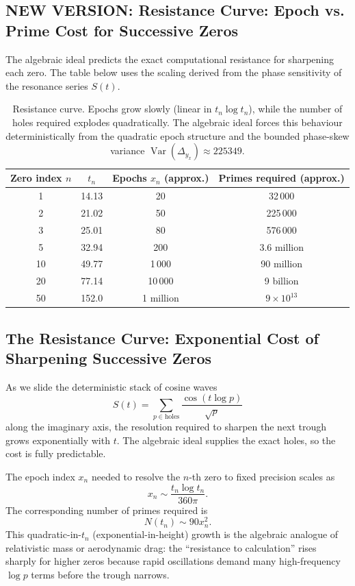 \documentclass[11pt,a4paper]{article}
\begin{document}
\subsection{NEW VERSION: Resistance Curve: Epoch vs. Prime Cost for Successive Zeros}

The algebraic ideal predicts the exact computational resistance for sharpening each zero. The table below uses the scaling derived from the phase sensitivity of the resonance series \(S(t)\).

\begin{table}[htbp]
\centering
\begin{tabular}{c|c|c|c}
Zero index \(n\) & \(t_n\) & Epochs \(x_n\) (approx.) & Primes required (approx.) \\
\hline
1  & 14.13 & 20   & 32\,000 \\
2  & 21.02 & 50   & 225\,000 \\
3  & 25.01 & 80   & 576\,000 \\
5  & 32.94 & 200  & 3.6 million \\
10 & 49.77 & 1\,000 & 90 million \\
20 & 77.14 & 10\,000 & 9 billion \\
50 & 152.0 & 1 million & \(9\times10^{13}\) \\
\end{tabular}
\caption{Resistance curve. Epochs grow slowly (linear in \(t_n \log t_n\)), while the number of holes required explodes quadratically. The algebraic ideal forces this behaviour deterministically from the quadratic epoch structure and the bounded phase-skew variance \(\operatorname{Var}(\Delta_{y_x})\approx225349\).}
\label{tab:resistance-curve}
\end{table}


\subsection{The Resistance Curve: Exponential Cost of Sharpening Successive Zeros}

As we slide the deterministic stack of cosine waves
\[
S(t)=\sum_{p\in\text{holes}}\frac{\cos(t\log p)}{\sqrt{p}}
\]
along the imaginary axis, the resolution required to sharpen the next trough grows exponentially with \(t\). The algebraic ideal supplies the exact holes, so the cost is fully predictable.

The epoch index \(x_n\) needed to resolve the \(n\)-th zero to fixed precision scales as
\[
x_n \sim \frac{t_n \log t_n}{360\pi}.
\]
The corresponding number of primes required is
\[
N(t_n) \sim 90 x_n^2.
\]
This quadratic-in-\(t_n\) (exponential-in-height) growth is the algebraic analogue of relativistic mass or aerodynamic drag: the “resistance to calculation” rises sharply for higher zeros because rapid oscillations demand many high-frequency \(\log p\) terms before the trough narrows.
\end{document}
